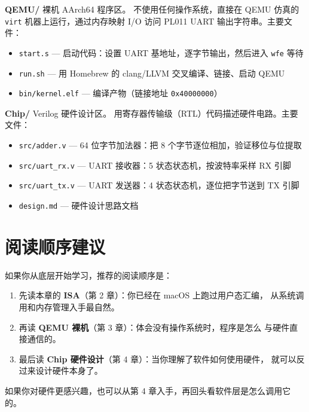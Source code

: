 \vspace{0.5cm}

\noindent\textbf{QEMU/} \quad 裸机 AArch64 程序区。
不使用任何操作系统，直接在 QEMU 仿真的 \texttt{virt} 机器上运行，通过内存映射
I/O 访问 PL011 UART 输出字符串。主要文件：
\begin{itemize}
    \item \texttt{start.s} — 启动代码：设置 UART 基地址，逐字节输出，然后进入 \texttt{wfe} 等待
    \item \texttt{run.sh} — 用 Homebrew 的 clang/LLVM 交叉编译、链接、启动 QEMU
    \item \texttt{bin/kernel.elf} — 编译产物（链接地址 \texttt{0x40000000}）
\end{itemize}

\vspace{0.5cm}

\noindent\textbf{Chip/} \quad Verilog 硬件设计区。
用寄存器传输级（RTL）代码描述硬件电路。主要文件：
\begin{itemize}
    \item \texttt{src/adder.v} — 64 位字节加法器：把 8 个字节逐位相加，验证移位与位提取
    \item \texttt{src/uart\_rx.v} — UART 接收器：5 状态状态机，按波特率采样 RX 引脚
    \item \texttt{src/uart\_tx.v} — UART 发送器：4 状态状态机，逐位把字节送到 TX 引脚
    \item \texttt{design.md} — 硬件设计思路文档
\end{itemize}

\section{阅读顺序建议}

如果你从底层开始学习，推荐的阅读顺序是：

\begin{enumerate}
    \item 先读本章的 \textbf{ISA}（第 2 章）：你已经在 macOS 上跑过用户态汇编，
        从系统调用和内存管理入手最自然。
    \item 再读 \textbf{QEMU 裸机}（第 3 章）：体会没有操作系统时，程序是怎么
        与硬件直接通信的。
    \item 最后读 \textbf{Chip 硬件设计}（第 4 章）：当你理解了软件如何使用硬件，
        就可以反过来设计硬件本身了。
\end{enumerate}

如果你对硬件更感兴趣，也可以从第 4 章入手，再回头看软件层是怎么调用它的。
